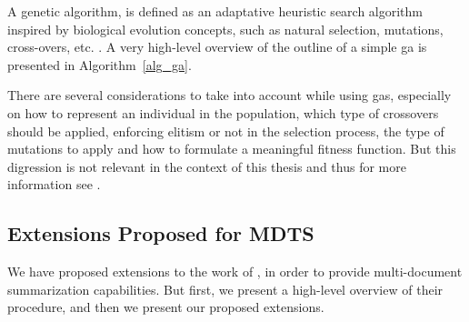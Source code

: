 \documentclass[12pt, titlepage]{uo_temp}
\makeatletter
\def\BState{\State\hskip-\ALG@thistlm}
\makeatother
\begin{document}
     A genetic algorithm, is defined as an adaptative heuristic search algorithm inspired
     by biological evolution concepts, such as natural selection, mutations, cross-overs,
     etc. \cite{eiben2008introduction}. A very high-level overview of the outline of a
     simple \gls{ga} is presented in Algorithm~\ref{alg_ga}.
     \begin{algorithm}
     \end{algorithm}
     There are several considerations to take into account while using \gls{ga}s, especially on
     how to represent an individual in the population, which type of crossovers should be
     applied, enforcing elitism or not in the selection process, the type of mutations to
     apply and how to formulate a meaningful fitness function. But this digression is not
     relevant in the context of this thesis and thus for more information see
     \cite{eiben2008introduction}.

     \subsection{Extensions Proposed for MDTS}
     We have proposed extensions to the work of \cite{qazvinian2008summarising}, in order
     to provide multi-document summarization capabilities. But first, we present a
     high-level overview of their procedure, and then we present our proposed extensions.

     \begin{algorithm}
     \end{algorithm}
\end{document}
